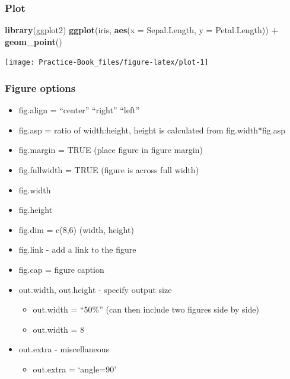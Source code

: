 \documentclass[
]{book}
\newenvironment{Shaded}{\begin{snugshade}}{\end{snugshade}}
\newcommand{\DataTypeTok}[1]{\textcolor[rgb]{0.13,0.29,0.53}{#1}}
\newcommand{\KeywordTok}[1]{\textcolor[rgb]{0.13,0.29,0.53}{\textbf{#1}}}
\newcommand{\NormalTok}[1]{#1}
\newcommand{\OperatorTok}[1]{\textcolor[rgb]{0.81,0.36,0.00}{\textbf{#1}}}
\newcommand{\StringTok}[1]{\textcolor[rgb]{0.31,0.60,0.02}{#1}}
\providecommand{\tightlist}{%
  \setlength{\itemsep}{0pt}\setlength{\parskip}{0pt}}
\begin{document}
\hypertarget{plot}{%
\subsubsection{Plot}\label{plot}}

\begin{Shaded}
\begin{Highlighting}[]
\KeywordTok{library}\NormalTok{(ggplot2)}
\KeywordTok{ggplot}\NormalTok{(iris, }\KeywordTok{aes}\NormalTok{(}\DataTypeTok{x =}\NormalTok{ Sepal.Length, }\DataTypeTok{y =}\NormalTok{ Petal.Length)) }\OperatorTok{+}\StringTok{ }\KeywordTok{geom\_point}\NormalTok{()}
\end{Highlighting}
\end{Shaded}

\begin{center}\texttt{[image: Practice-Book\_files/figure-latex/plot-1]} \end{center}

\hypertarget{figure-options}{%
\subsubsection{Figure options}\label{figure-options}}

\begin{itemize}
\tightlist
\item
  fig.align = ``center'' ``right'' ``left''
\item
  fig.asp = ratio of width:height, height is calculated from fig.width*fig.asp
\item
  fig.margin = TRUE (place figure in figure margin)
\item
  fig.fullwidth = TRUE (figure is across full width)
\item
  fig.width
\item
  fig.height
\item
  fig.dim = c(8,6) (width, height)
\item
  fig.link - add a link to the figure
\item
  fig.cap = figure caption
\item
  out.width, out.height - specify output size

  \begin{itemize}
  \tightlist
  \item
    out.width = ``50\%'' (can then include two figures side by side)
  \item
    out.width = 8
  \end{itemize}
\item
  out.extra - miscellaneous

  \begin{itemize}
  \tightlist
  \item
    out.extra = `angle=90'
  \end{itemize}
\end{itemize}
\end{document}

